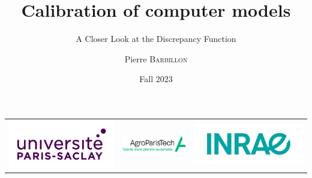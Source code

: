 \documentclass[nopagenumber,9pt]{beamer}
\title[Discrepancy]{Calibration of computer models}
\subtitle{A Closer Look at the Discrepancy Function}
\author[P. Barbillon]{ Pierre \textsc{Barbillon}}
\date{Fall 2023}
\begin{document}
\begin{frame}
\titlepage
\vspace{-1cm}
\centering
\begin{tabular}{ccc}
 \includegraphics[scale=.08]{LogoUPSaclay.jpg}&
  \includegraphics[scale=1.3]{agrologo.png}&
   \includegraphics[scale=.1]{LogoINRAE.jpg}
\end{tabular}


\end{frame}
\end{document}
